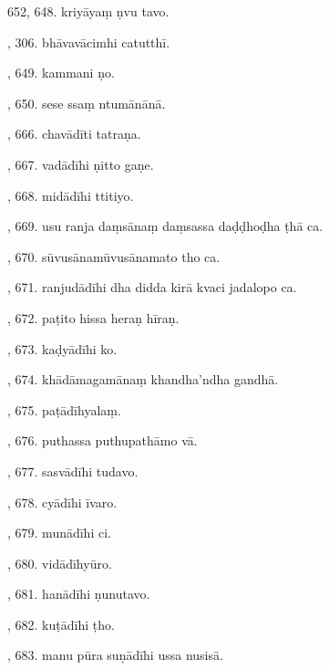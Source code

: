 652, 648. kriyāyaṃ ṇvu tavo.\par {}, 306. bhāvavācimhi catutthī.\par {}, 649. kammani ṇo.\par {}, 650. sese ssaṃ ntumānānā.\par {}, 666. chavādīti tatraṇa.\par {}, 667. vadādīhi ṇitto gaṇe.\par {}, 668. midādīhi ttitiyo.\par {}, 669. usu ranja daṃsānaṃ daṃsassa daḍḍhoḍha ṭhā ca.\par {}, 670. sūvusānamūvusānamato tho ca.\par {}, 671. ranjudādīhi dha didda kirā kvaci jadalopo ca.\par {}, 672. paṭito hissa heraṇ hīraṇ.\par {}, 673. kaḍyādīhi ko.\par {}, 674. khādāmagamānaṃ khandha’ndha gandhā.\par {}, 675. paṭādīhyalaṃ.\par {}, 676. puthassa puthupathāmo vā.\par {}, 677. sasvādīhi tudavo.\par {}, 678. cyādīhi īvaro.\par {}, 679. munādīhi ci.\par {}, 680. vidādīhyūro.\par {}, 681. hanādīhi ṇunutavo.\par {}, 682. kuṭādīhi ṭho.\par {}, 683. manu pūra suṇādīhi ussa nusisā.\par \noindent
